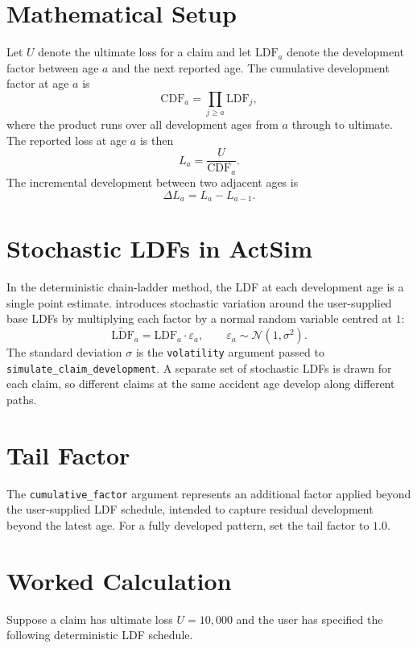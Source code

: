\section{Mathematical Setup}

Let $U$ denote the ultimate loss for a claim and let $\mathrm{LDF}_a$
denote the development factor between age $a$ and the next reported age.
The cumulative development factor at age $a$ is
\[
    \mathrm{CDF}_a = \prod_{j \geq a} \mathrm{LDF}_j,
\]
where the product runs over all development ages from $a$ through to
ultimate. The reported loss at age $a$ is then
\[
    L_a = \frac{U}{\mathrm{CDF}_a}.
\]
The incremental development between two adjacent ages is
\[
    \Delta L_a = L_a - L_{a-1}.
\]

\section{Stochastic LDFs in ActSim}

In the deterministic chain-ladder method, the LDF at each development
age is a single point estimate. \actsim introduces stochastic variation
around the user-supplied base LDFs by multiplying each factor by a
normal random variable centred at $1$:
\[
    \widetilde{\mathrm{LDF}}_a = \mathrm{LDF}_a \cdot \varepsilon_a,
    \qquad \varepsilon_a \sim \mathcal{N}(1, \sigma^2).
\]
The standard deviation $\sigma$ is the \texttt{volatility} argument
passed to \texttt{simulate\_claim\_development}. A separate set of
stochastic LDFs is drawn for each claim, so different claims at the
same accident age develop along different paths.

\section{Tail Factor}

The \texttt{cumulative\_factor} argument represents an additional
factor applied beyond the user-supplied LDF schedule, intended to
capture residual development beyond the latest age. For a fully
developed pattern, set the tail factor to $1.0$.

\section{Worked Calculation}

Suppose a claim has ultimate loss $U = 10{,}000$ and the user has
specified the following deterministic LDF schedule.

